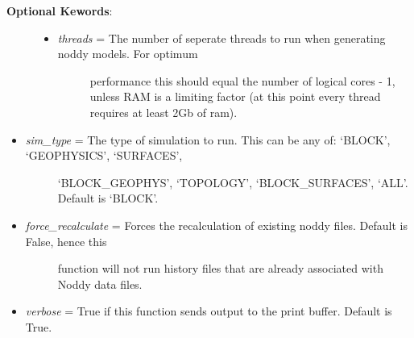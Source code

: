 \documentclass[a4paper,10pt,english]{sphinxmanual}
\begin{document}
\begin{fulllineitems}
\begin{fulllineitems}
\begin{description}
\begin{itemize}
\end{itemize}

\item[{\textbf{Optional Kewords}:}] \leavevmode\begin{itemize}
\item {} \begin{description}
\item[{\emph{threads} = The number of seperate threads to run when generating noddy models. For optimum}] \leavevmode
performance this should equal the number of logical cores - 1, unless RAM is a 
limiting factor (at this point every thread requires at least 2Gb of ram).

\end{description}

\end{itemize}

\end{description}
\begin{itemize}
\item {} \begin{description}
\item[{\emph{sim\_type} = The type of simulation to run. This can be any of: `BLOCK', `GEOPHYSICS', `SURFACES', }] \leavevmode
`BLOCK\_GEOPHYS', `TOPOLOGY', `BLOCK\_SURFACES', `ALL'. Default is `BLOCK'.

\end{description}

\item {} \begin{description}
\item[{\emph{force\_recalculate} = Forces the recalculation of existing noddy files. Default is False, hence this}] \leavevmode
function will not run history files that are already associated with Noddy data files.

\end{description}

\item {} 
\emph{verbose} = True if this function sends output to the print buffer. Default is True.

\end{itemize}

\end{fulllineitems}



\end{fulllineitems}
\end{document}
